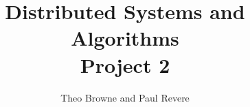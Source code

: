 \documentclass[12pt]{scrartcl}
\begin{document}
	\title{Distributed Systems and Algorithms\\Project 2}
	\author{Theo Browne and Paul Revere}
	\date{\vspace{-5ex}}

	\maketitle
\end{document}
